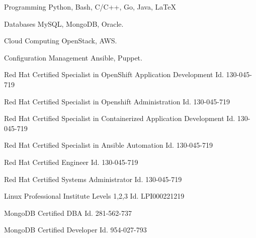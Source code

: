 

\begin{cvskills}

  \cvskill
    {Programming} %
    {Python, Bash, C/C++, Go, Java, LaTeX} %

  \cvskill
    {Databases} %
    {MySQL, MongoDB, Oracle.} %

  \cvskill
    {Cloud Computing} %
    {OpenStack, AWS.} %

  \cvskill
    {Configuration Management} %
    {Ansible, Puppet.} %

  \cvskill
    {Red Hat Certified Specialist in OpenShift Application Development} %
    {Id. 130-045-719} %

  \cvskill
    {Red Hat Certified Specialist in Openshift Administration} %
    {Id. 130-045-719} %

  \cvskill
    {Red Hat Certified Specialist in Containerized Application Development} %
    {Id. 130-045-719} %

  \cvskill
    {Red Hat Certified Specialist in Ansible Automation} %
    {Id. 130-045-719} %

  \cvskill
    {Red Hat Certified Engineer} %
    {Id. 130-045-719} %

  \cvskill
    {Red Hat Certified Systems Administrator} %
    {Id. 130-045-719} %

  \cvskill
    {Linux Professional Institute Levels 1,2,3} %
    {Id. LPI000221219} %

  \cvskill
    {MongoDB Certified DBA} %
    {Id. 281-562-737} %

  \cvskill
    {MongoDB Certified Developer} %
    {Id. 954-027-793} %

\end{cvskills}
